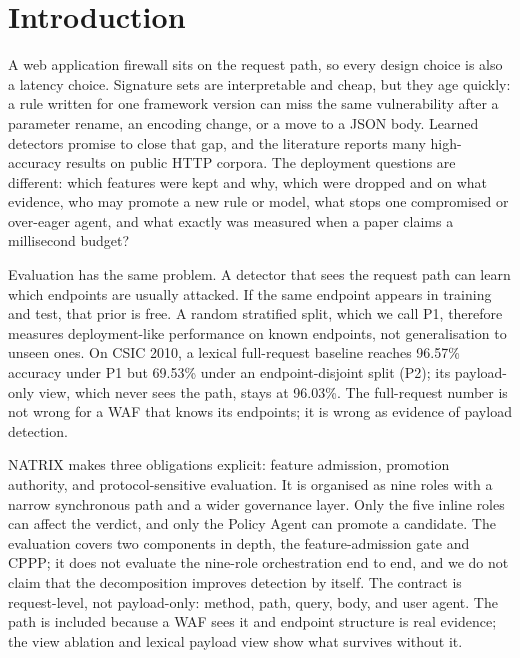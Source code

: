 \documentclass[preprint,11pt]{elsarticle}
\begin{document}
\section{Introduction}\label{introduction}

A web application firewall sits on the request path, so every design
choice is also a latency choice. Signature sets are interpretable and
cheap, but they age quickly: a rule written for one framework version
can miss the same vulnerability after a parameter rename, an encoding
change, or a move to a JSON body. Learned detectors promise to close
that gap, and the literature reports many high-accuracy results on
public HTTP corpora. The deployment questions are different: which
features were kept and why, which were dropped and on what evidence, who
may promote a new rule or model, what stops one compromised or
over-eager agent, and what exactly was measured when a paper claims a
millisecond budget?

Evaluation has the same problem. A detector that sees the request path
can learn which endpoints are usually attacked. If the same endpoint
appears in training and test, that prior is free. A random stratified
split, which we call P1, therefore measures deployment-like performance
on known endpoints, not generalisation to unseen ones. On CSIC 2010, a
lexical full-request baseline reaches 96.57\% accuracy under P1 but
69.53\% under an endpoint-disjoint split (P2); its payload-only view,
which never sees the path, stays at 96.03\%. The full-request number is
not wrong for a WAF that knows its endpoints; it is wrong as evidence of
payload detection.

NATRIX makes three obligations explicit: feature admission, promotion
authority, and protocol-sensitive evaluation. It is organised as nine
roles with a narrow synchronous path and a wider governance layer. Only
the five inline roles can affect the verdict, and only the Policy Agent
can promote a candidate. The evaluation covers two components in depth,
the feature-admission gate and CPPP; it does not evaluate the nine-role
orchestration end to end, and we do not claim that the decomposition
improves detection by itself. The contract is request-level, not
payload-only: method, path, query, body, and user agent. The path is
included because a WAF sees it and endpoint structure is real evidence;
the view ablation and lexical payload view show what survives without
it.
\end{document}
